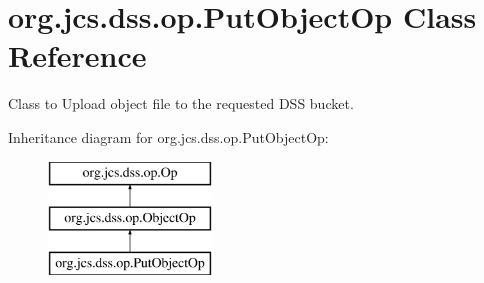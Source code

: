 \hypertarget{classorg_1_1jcs_1_1dss_1_1op_1_1PutObjectOp}{}\section{org.\+jcs.\+dss.\+op.\+Put\+Object\+Op Class Reference}
\label{classorg_1_1jcs_1_1dss_1_1op_1_1PutObjectOp}


Class to Upload object file to the requested D\+SS bucket.  


Inheritance diagram for org.\+jcs.\+dss.\+op.\+Put\+Object\+Op\+:\begin{figure}[H]
\begin{center}
\leavevmode
\includegraphics[height=3.000000cm]{classorg_1_1jcs_1_1dss_1_1op_1_1PutObjectOp}
\end{center}
\end{figure}

